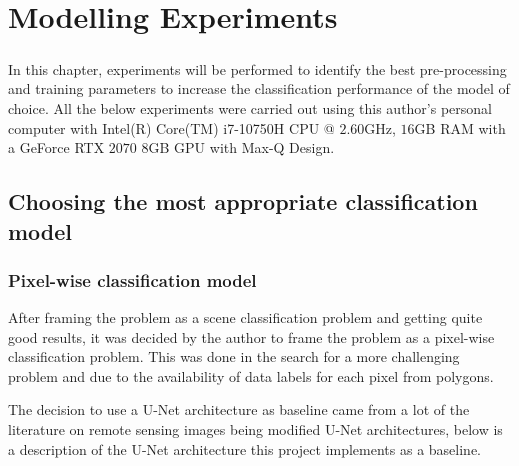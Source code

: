 \chapter{ Modelling Experiments} \label{experiments_chapter}
\paragraph{}
In this chapter, experiments will be performed to identify the best pre-processing and training parameters to increase the classification performance of the model of choice. 
All the below experiments were carried out using this author's personal computer with Intel(R) Core(TM) i7-10750H \gls{CPU} @ $2.60$GHz, $16$GB \gls{RAM} with a GeForce RTX $2070$ $8$GB \gls{GPU} with Max-Q Design.
\section{Choosing the most appropriate classification model} \label{classification_models}

\subsection{Pixel-wise classification model} \label{pixel_model}
After framing the problem as a scene classification problem and getting quite good results, it was decided by the author to frame the problem as a pixel-wise classification problem. This was done in the search for a more challenging problem and due to the availability of data labels for each pixel from polygons.

The decision to use a U-Net architecture as baseline came from a lot of the literature on remote sensing images being modified U-Net architectures, below is a description of the U-Net architecture this project implements as a baseline.
